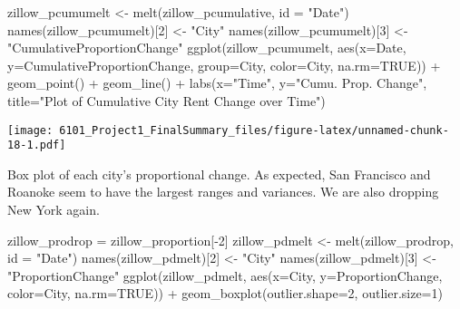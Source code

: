\documentclass[
]{article}
\newenvironment{Shaded}{\begin{snugshade}}{\end{snugshade}}
\newcommand{\AttributeTok}[1]{\textcolor[rgb]{0.77,0.63,0.00}{#1}}
\newcommand{\ConstantTok}[1]{\textcolor[rgb]{0.00,0.00,0.00}{#1}}
\newcommand{\DecValTok}[1]{\textcolor[rgb]{0.00,0.00,0.81}{#1}}
\newcommand{\FunctionTok}[1]{\textcolor[rgb]{0.00,0.00,0.00}{#1}}
\newcommand{\NormalTok}[1]{#1}
\newcommand{\OtherTok}[1]{\textcolor[rgb]{0.56,0.35,0.01}{#1}}
\newcommand{\SpecialCharTok}[1]{\textcolor[rgb]{0.00,0.00,0.00}{#1}}
\newcommand{\StringTok}[1]{\textcolor[rgb]{0.31,0.60,0.02}{#1}}
\begin{document}
\begin{Shaded}
\begin{Highlighting}[]
\NormalTok{zillow\_pcumumelt }\OtherTok{\textless{}{-}} \FunctionTok{melt}\NormalTok{(zillow\_pcumulative, }\AttributeTok{id =} \StringTok{"Date"}\NormalTok{)}
\FunctionTok{names}\NormalTok{(zillow\_pcumumelt)[}\DecValTok{2}\NormalTok{] }\OtherTok{\textless{}{-}} \StringTok{"City"}
\FunctionTok{names}\NormalTok{(zillow\_pcumumelt)[}\DecValTok{3}\NormalTok{] }\OtherTok{\textless{}{-}} \StringTok{"CumulativeProportionChange"}
\FunctionTok{ggplot}\NormalTok{(zillow\_pcumumelt, }\FunctionTok{aes}\NormalTok{(}\AttributeTok{x=}\NormalTok{Date, }\AttributeTok{y=}\NormalTok{CumulativeProportionChange, }\AttributeTok{group=}\NormalTok{City, }\AttributeTok{color=}\NormalTok{City, }\AttributeTok{na.rm=}\ConstantTok{TRUE}\NormalTok{)) }\SpecialCharTok{+} \FunctionTok{geom\_point}\NormalTok{() }\SpecialCharTok{+} \FunctionTok{geom\_line}\NormalTok{() }\SpecialCharTok{+} \FunctionTok{labs}\NormalTok{(}\AttributeTok{x=}\StringTok{"Time"}\NormalTok{, }\AttributeTok{y=}\StringTok{"Cumu. Prop. Change"}\NormalTok{, }\AttributeTok{title=}\StringTok{"Plot of Cumulative City Rent Change over Time"}\NormalTok{)}
\end{Highlighting}
\end{Shaded}

\texttt{[image: 6101\_Project1\_FinalSummary\_files/figure-latex/unnamed-chunk-18-1.pdf]}

Box plot of each city's proportional change. As expected, San Francisco
and Roanoke seem to have the largest ranges and variances. We are also
dropping New York again.

\begin{Shaded}
\begin{Highlighting}[]
\NormalTok{zillow\_prodrop }\OtherTok{=}\NormalTok{ zillow\_proportion[}\SpecialCharTok{{-}}\DecValTok{2}\NormalTok{]}
\NormalTok{zillow\_pdmelt }\OtherTok{\textless{}{-}} \FunctionTok{melt}\NormalTok{(zillow\_prodrop, }\AttributeTok{id =} \StringTok{"Date"}\NormalTok{)}
\FunctionTok{names}\NormalTok{(zillow\_pdmelt)[}\DecValTok{2}\NormalTok{] }\OtherTok{\textless{}{-}} \StringTok{"City"}
\FunctionTok{names}\NormalTok{(zillow\_pdmelt)[}\DecValTok{3}\NormalTok{] }\OtherTok{\textless{}{-}} \StringTok{"ProportionChange"}
\FunctionTok{ggplot}\NormalTok{(zillow\_pdmelt, }\FunctionTok{aes}\NormalTok{(}\AttributeTok{x=}\NormalTok{City, }\AttributeTok{y=}\NormalTok{ProportionChange, }\AttributeTok{color=}\NormalTok{City, }\AttributeTok{na.rm=}\ConstantTok{TRUE}\NormalTok{)) }\SpecialCharTok{+} \FunctionTok{geom\_boxplot}\NormalTok{(}\AttributeTok{outlier.shape=}\DecValTok{2}\NormalTok{, }\AttributeTok{outlier.size=}\DecValTok{1}\NormalTok{)}
\end{Highlighting}
\end{Shaded}
\end{document}

